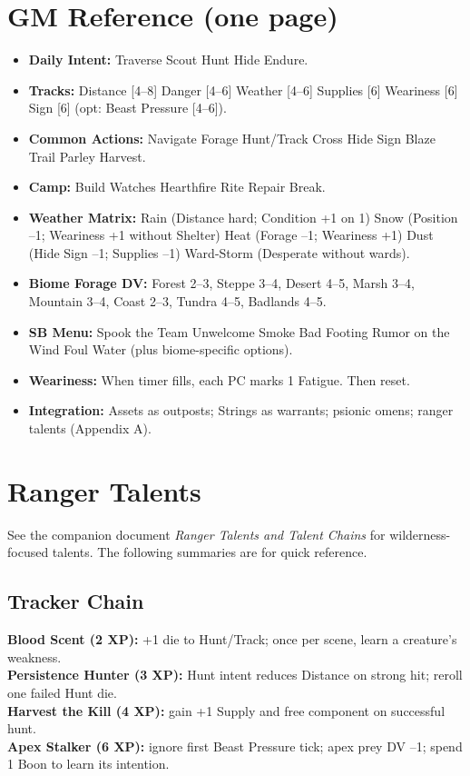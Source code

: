 \documentclass[11pt]{article}
\begin{document}
\section*{GM Reference (one page)}
\begin{itemize}
  \item \textbf{Daily Intent:} Traverse \textbullet{} Scout \textbullet{} Hunt \textbullet{} Hide \textbullet{} Endure.
  \item \textbf{Tracks:} Distance [4--8] \textbullet{} Danger [4--6] \textbullet{} Weather [4--6] \textbullet{} Supplies [6] \textbullet{} Weariness [6] \textbullet{} Sign [6] (opt: Beast Pressure [4--6]).
  \item \textbf{Common Actions:} Navigate \textbullet{} Forage \textbullet{} Hunt/Track \textbullet{} Cross \textbullet{} Hide Sign \textbullet{} Blaze Trail \textbullet{} Parley \textbullet{} Harvest.
  \item \textbf{Camp:} Build \textbullet{} Watches \textbullet{} Hearthfire Rite \textbullet{} Repair \textbullet{} Break.
  \item \textbf{Weather Matrix:} Rain (Distance hard; Condition +1 on 1) \textbullet{} Snow (Position --1; Weariness +1 without Shelter) \textbullet{} Heat (Forage --1; Weariness +1) \textbullet{} Dust (Hide Sign --1; Supplies --1) \textbullet{} Ward-Storm (Desperate without wards).
  \item \textbf{Biome Forage DV:} Forest 2--3, Steppe 3--4, Desert 4--5, Marsh 3--4, Mountain 3--4, Coast 2--3, Tundra 4--5, Badlands 4--5.
  \item \textbf{SB Menu:} Spook the Team \textbullet{} Unwelcome Smoke \textbullet{} Bad Footing \textbullet{} Rumor on the Wind \textbullet{} Foul Water (plus biome-specific options).
  \item \textbf{Weariness:} When timer fills, each PC marks 1 Fatigue. Then reset.
  \item \textbf{Integration:} Assets as outposts; Strings as warrants; psionic omens; ranger talents (Appendix A).
\end{itemize}

\vfill
\appendix
\section{Ranger Talents}
\label{app:ranger-talents}
See the companion document \textit{Ranger Talents and Talent Chains} for wilderness-focused talents. The following summaries are for quick reference.

\subsection{Tracker Chain}
\textbf{Blood Scent (2 XP):} +1 die to Hunt/Track; once per scene, learn a creature's weakness.\\
\textbf{Persistence Hunter (3 XP):} Hunt intent reduces Distance on strong hit; reroll one failed Hunt die.\\
\textbf{Harvest the Kill (4 XP):} gain +1 Supply and free component on successful hunt.\\
\textbf{Apex Stalker (6 XP):} ignore first Beast Pressure tick; apex prey DV --1; spend 1 Boon to learn its intention.
\end{document}
